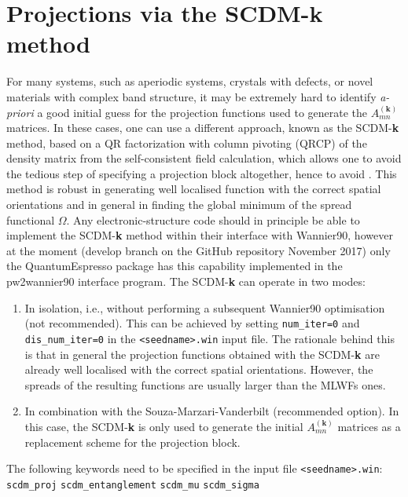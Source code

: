 \section{Projections via the SCDM-\textbf{k} method}
For many systems, such as aperiodic systems, crystals with defects, or novel materials with complex band structure,  it may be extremely hard to identify \emph{a-priori} a good initial guess for the projection functions used to generate the $A_{mn}^{(\mathbf{k})}$ matrices. In these cases, one can use a different approach, known as the SCDM-\textbf{k} method\cite{LinLin-ArXiv2017}, based on a QR factorization with column pivoting (QRCP) of the density matrix from the self-consistent field calculation, which allows one to avoid the tedious step of specifying a projection block altogether, hence to avoid . This method is robust in generating well localised function with the correct spatial orientations and in general in finding the global minimum of the spread functional $\Omega$. Any electronic-structure code should in principle be able to implement the SCDM-\textbf{k} method within their interface with Wannier90, however at the moment (develop branch on the GitHub repository November 2017) only the QuantumEspresso package has this capability implemented in the pw2wannier90 interface program.
 The SCDM-\textbf{k} can operate in two modes: 
\begin{enumerate}
\item In isolation, i.e., without performing a subsequent Wannier90 optimisation (not recommended). This can be achieved by setting {\tt num\_iter=0} and {\tt dis\_num\_iter=0} in the \verb#<seedname>.win# input file. The rationale behind this is that in general the projection functions obtained with the SCDM-\textbf{k} are already well localised with the correct spatial orientations. However, the spreads of the resulting functions are usually larger than the MLWFs ones.  
\item In combination with the Souza-Marzari-Vanderbilt (recommended option). In this case, the SCDM-\textbf{k} is only used to generate the initial $A_{mn}^{(\mathbf{k})}$ matrices as a replacement scheme for the projection block.
\end{enumerate}

The following keywords need to be specified in the input file \verb#<seedname>.win#:
\noindent
\verb#scdm_proj#
\verb#scdm_entanglement#
\verb#scdm_mu#
\verb#scdm_sigma#
\noindent
